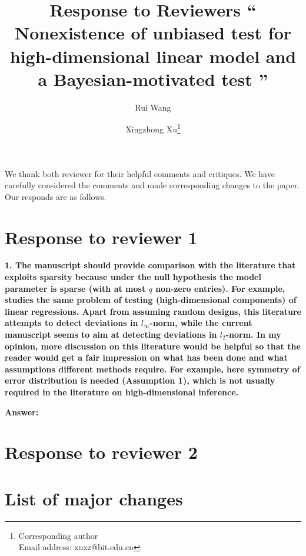 \documentclass[11pt]{article}
\theoremstyle{plain}
\theoremstyle{definition}
\theoremstyle{remark}
\begin{document}
\title{
Response to Reviewers
``
Nonexistence of unbiased test for high-dimensional linear model and a Bayesian-motivated test 
''
}



\author[1]{Rui Wang}
\author[1,2]{Xingzhong Xu\thanks{Corresponding author\\Email address: xuxz@bit.edu.cn}}

\maketitle

We thank both reviewer for their helpful comments and critiques.
We have carefully considered the comments and made corresponding changes to the paper.
Our responds are as follows.

\section{Response to reviewer 1}

\textbf{
    1.
    The manuscript should provide comparison with the literature that exploits sparsity because under the null hypothesis the model parameter is sparse (with at most $q$ non-zero entries).
    For example, \cite{zhang2016simultaneous} studies the same problem of testing (high-dimensional components) of linear regressions. Apart from assuming random designs, this literature attempts to detect deviations in $l_\infty$-norm, while the current manuscript seems to aim at detecting deviations in
    $l_2$-norm.
    In my opinion, more discussion on this literature would be helpful so that the reader would get a fair impression on what has been done and what assumptions different methods require.
    For example, here symmetry of error distribution is needed (Assumption 1), which is not usually required in the literature on high-dimensional inference.
}

\textbf{Answer:}



\section{Response to reviewer 2}





\section{List of major changes}








\end{document}

